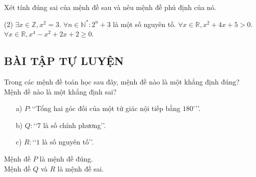 \begin{vd}
	Xét tính đúng sai của mệnh đề sau và nêu mệnh đề phủ định của nó.
	\begin{tasks}(2)
		\task $\exists x\in \mathbb{Z},x^2=3$.
		\task $\forall n\in {\mathbb{N}}^{*}:2^n+3$ là một số nguyên tố.
		\task $\forall x\in \mathbb{R},x^2+4x+5>0$.
		\task $\forall x\in \mathbb{R},x^4-x^2+2x+2\ge 0$.
	\end{tasks}
\end{vd}

\subsection{BÀI TẬP TỰ LUYỆN}
\begin{baitap}%
	Trong các mệnh đề toán học sau đây, mệnh đề nào là một khẳng định đúng? Mệnh đề nào là một khẳng định sai?
	\begin{itemize}
		\item [a)]$P\colon$\lq\lq Tổng hai góc đối của một tứ giác nội tiếp bằng $180^{\circ}$\rq\rq.
		\item [b)]$Q\colon$\lq\lq $7$ là số chính phương\rq\rq.
		\item [c)]$R\colon$\lq\lq $1$ là số nguyên tố\rq\rq.
	\end{itemize}
	\loigiai
	{
		Mệnh đề $P$ là mệnh đề đúng. \\
		Mệnh đề $Q$ và $R$ là mệnh đề sai. \\
	}
\end{baitap}

